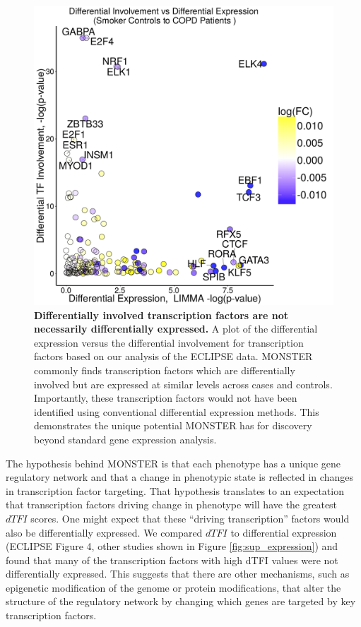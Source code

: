 \begin{figure}
\includegraphics[width=1\linewidth]{figures/figure4}
\caption[Differentially involved vs differentially expressed transcription factors]{\textbf{Differentially involved transcription factors are not necessarily differentially expressed.} A plot of the differential expression versus the differential involvement for transcription factors based on our analysis of the ECLIPSE data. MONSTER commonly finds transcription factors which are differentially involved but are expressed at similar levels across cases and controls. Importantly, these transcription factors would not have been identified using conventional differential expression methods. This demonstrates the unique potential MONSTER has for discovery beyond standard gene expression analysis.}
\label{fig:expression}
\end{figure}

The hypothesis behind MONSTER is that each phenotype has a unique gene regulatory network and that a change in phenotypic state is reflected in changes in transcription factor targeting. That hypothesis translates to an expectation that transcription factors driving change in phenotype will have the greatest $dTFI$ scores. One might expect that these ``driving transcription'' factors would also be differentially expressed.  We compared $dTFI$ to differential expression (ECLIPSE Figure 4, other studies shown in Figure \ref{fig:sup_expression}) and found that many of the transcription factors with high dTFI values were not differentially expressed. This suggests that there are other mechanisms, such as epigenetic modification of the genome or protein modifications, that alter the structure of the regulatory network by changing which genes  are targeted by key transcription factors. 


